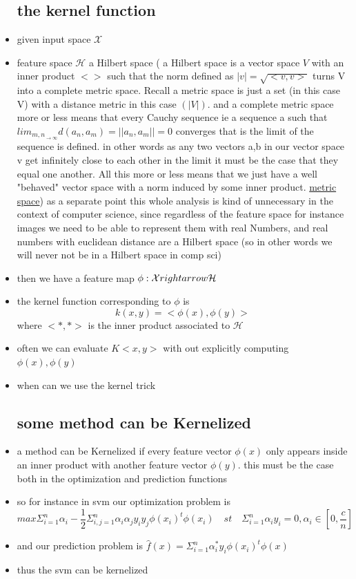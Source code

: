 \documentclass{article}
\begin{document}
\begin{itemize}
\subsection{the kernel function}
\item given input space $\mathcal{X}$
\item feature space $\mathcal{H}$ a Hilbert space ( a Hilbert space is a vector space $V$ with an inner product $<>$ such that the norm defined as  $|v|=\sqrt{<v,v>}$ turns V into a complete metric space. Recall a metric space is just a set (in this case V) with a distance metric in this case $(|V|)$. and a complete metric space more or less means that every Cauchy sequence ie a sequence a such that $lim_{m,n}_{\rightarrow\infty}d(a_n,a_m)=||a_n,a_m||=0$ converges that is the limit of the sequence is defined. in other words as any two vectors a,b in our vector space v get infinitely close to each other in the limit it must be the case that  they equal one another. All this more or less means that we just have a well "behaved"  vector space with a norm induced by some inner product.  \href{https://mathworld.wolfram.com/HilbertSpace.html}{metric space}) as a separate point this whole analysis is kind of unnecessary in the context of computer science, since regardless of the feature space for instance images we need to be able to represent them with real Numbers, and real numbers with euclidean distance are a Hilbert space (so in other words we will never not be in a Hilbert space in comp sci)
\item then we have a feature map $\phi:\mathcal{X}\\rightarrow \mathcal{H}$
\item the kernel function corresponding to $\phi$ is $$k(x,y)=<\phi(x), \phi(y)>$$ where $<*,*>$ is the inner product associated to $\mathcal{H}$
\item often we can evaluate $K<x,y> $ with out explicitly computing $\phi(x),\phi(y)$
\item when can we use the kernel trick
\subsection{some method can be Kernelized}
\item a method can be Kernelized if  every feature vector $\phi(x)$ only appears inside an inner product with another feature vector $\phi(y)$. this must be the case both in the optimization and prediction functions 
\item  so for instance in svm our optimization problem is 
 $$max \Sigma_{i=1}^{n}\alpha_{i}-\frac{1}{2}\Sigma_{i,j=1}^{n}\alpha_i\alpha_{j}y_iy_j\phi(x_i)^{t}\phi(x_i) \quad st \quad  \Sigma_{i=1}^{n}\alpha_{i}y_{i}=0, \alpha_{i}\in [0,\frac{c}{n}]$$
\item and our prediction problem is $\hat{f}(x)=\Sigma_{i=1}^{n}\alpha_{i}^{*}y_i\phi(x_i)^t\phi(x)$
\item thus the svm can be kernelized

\end{itemize}
\end{document}

